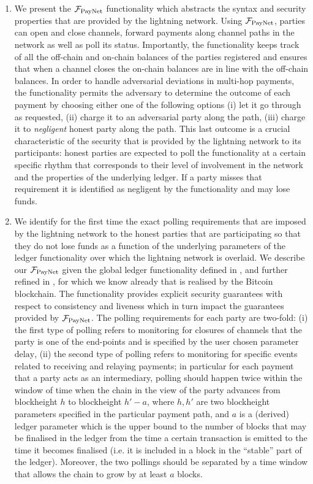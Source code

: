\begin{enumerate}
\item We present the $\mathcal{F}_{\mathrm{PayNet}}{}$ functionality which abstracts the syntax and
security properties that are provided by the lightning network. 
Using  $\mathcal{F}_{\mathrm{PayNet}}{}$, parties can open and close channels, forward
payments along channel paths in the network as well as poll its status. 
Importantly, the functionality keeps track of all the off-chain and on-chain
balances
of the  parties registered  and ensures that when a channel closes
the on-chain balances are in line with the off-chain balances.
In order to handle adversarial deviations in multi-hop payments, 
the functionality
permits the adversary to determine the outcome of each payment
by choosing either one of the following options (i) let it go through
as requested, (ii) charge it to an adversarial party along the path, 
(iii) charge it to {\em negligent } honest party along the path. 
This last outcome is a crucial  characteristic of the security
that is provided by the lightning network to its participants: 
honest parties are expected to poll the functionality at a certain 
specific rhythm that corresponds to their level of involvement in the network
and the properties of the underlying ledger. If a party misses that requirement
it is identified as negligent by the functionality and may lose funds. 

\item We identify for the first time 
the exact polling requirements that are imposed by the lightning
network to the honest parties that are participating so that they do not lose 
funds as a function of the underlying parameters of the ledger functionality
over which the lightning network is overlaid. 
We describe our  $\mathcal{F}_{\mathrm{PayNet}}{}$ given the global ledger functionality defined in 
\cite{BMTZ17}, and further refined in \cite{genesis}, for which we know already that is realised by the Bitcoin blockchain. The functionality provides explicit security guarantees with respect to consistency and liveness which in turn impact 
the guarantees provided by $\mathcal{F}_{\mathrm{PayNet}}{}$. The polling requirements for each party 
are  two-fold: (i) the first type of polling refers to monitoring for closures of channels that the party is one of the end-points and is specified by the 
user chosen parameter $\mathrm{delay}$, 
(ii) the second type of polling refers to monitoring for specific 
events related to receiving and relaying payments; in particular for each payment that a party acts as an intermediary,  polling should happen twice within the window of time when the chain in the view of the party advances  from blockheight  $h$
to blockheight $h'-a$, where $h,h'$ are two blockheight parameters specified  
in the particular payment path, and $a$ is a (derived) ledger parameter 
which is the upper bound to 
the number of blocks  that may be finalised in the ledger 
from the time a certain transaction is emitted to the time it becomes finalised
(i.e. it is included in a block in the ``stable''  part of the ledger). 
Moreover, the two pollings should be separated by a time window that allows
the chain to grow by at least $a$ blocks. 


\end{enumerate}
